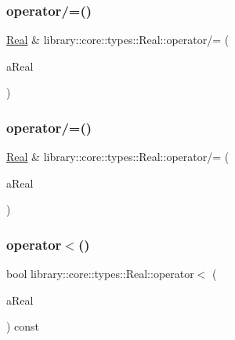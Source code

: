 \subsubsection{\texorpdfstring{operator/=()}{operator/=()}\hspace{0.1cm}{\footnotesize\ttfamily [1/2]}}
{\footnotesize\ttfamily \hyperlink{classlibrary_1_1core_1_1types_1_1_real}{Real} \& library\+::core\+::types\+::\+Real\+::operator/= (\begin{DoxyParamCaption}\item[{const \hyperlink{classlibrary_1_1core_1_1types_1_1_real}{Real} \&}]{a\+Real }\end{DoxyParamCaption})}

\mbox{\label{classlibrary_1_1core_1_1types_1_1_real_a6a9a6530460f746c7e7fdbba3b6932fe}} 
\subsubsection{\texorpdfstring{operator/=()}{operator/=()}\hspace{0.1cm}{\footnotesize\ttfamily [2/2]}}
{\footnotesize\ttfamily \hyperlink{classlibrary_1_1core_1_1types_1_1_real}{Real} \& library\+::core\+::types\+::\+Real\+::operator/= (\begin{DoxyParamCaption}\item[{const \hyperlink{classlibrary_1_1core_1_1types_1_1_real_a9c5c8826b7e5a8e39544d23fea6c0e1c}{Real\+::\+Value\+Type} \&}]{a\+Real }\end{DoxyParamCaption})}

\mbox{\label{classlibrary_1_1core_1_1types_1_1_real_a938344b0a800d4fe3fcc51bffd95df73}} 
\subsubsection{\texorpdfstring{operator$<$()}{operator<()}\hspace{0.1cm}{\footnotesize\ttfamily [1/2]}}
{\footnotesize\ttfamily bool library\+::core\+::types\+::\+Real\+::operator$<$ (\begin{DoxyParamCaption}\item[{const \hyperlink{classlibrary_1_1core_1_1types_1_1_real}{Real} \&}]{a\+Real }\end{DoxyParamCaption}) const}

